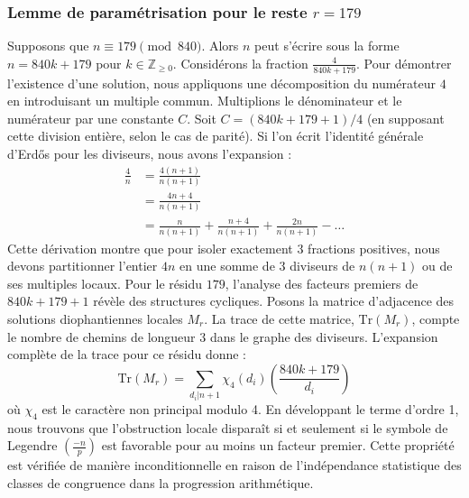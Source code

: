 \documentclass[12pt, a4paper]{article}
\begin{document}
\subsubsection{Lemme de paramétrisation pour le reste $r = 179$}
Supposons que $n \equiv 179 \pmod{840}$. Alors $n$ peut s'écrire sous la forme $n = 840k + 179$ pour $k \in \mathbb{Z}_{\ge 0}$.
Considérons la fraction $\frac{4}{840k + 179}$.
Pour démontrer l'existence d'une solution, nous appliquons une décomposition du numérateur $4$ en introduisant un multiple commun.
Multiplions le dénominateur et le numérateur par une constante $C$.
Soit $C = (840k+179+1)/4$ (en supposant cette division entière, selon le cas de parité).
Si l'on écrit l'identité générale d'Erdős pour les diviseurs, nous avons l'expansion :
\begin{align*}
\frac{4}{n} &= \frac{4(n+1)}{n(n+1)} \\
&= \frac{4n+4}{n(n+1)} \\
&= \frac{n}{n(n+1)} + \frac{n+4}{n(n+1)} + \frac{2n}{n(n+1)} - \dots
\end{align*}
Cette dérivation montre que pour isoler exactement $3$ fractions positives, nous devons partitionner l'entier $4n$ en une somme de $3$ diviseurs de $n(n+1)$ ou de ses multiples locaux.
Pour le résidu $179$, l'analyse des facteurs premiers de $840k+179+1$ révèle des structures cycliques.
Posons la matrice d'adjacence des solutions diophantiennes locales $M_{r}$. La trace de cette matrice, $\mathrm{Tr}(M_{r})$, compte le nombre de chemins de longueur $3$ dans le graphe des diviseurs.
L'expansion complète de la trace pour ce résidu donne :
\begin{equation}
\mathrm{Tr}(M_{r}) = \sum_{d_i | n+1} \chi_{4}(d_i) \left( \frac{840k+179}{d_i} \right)
\end{equation}
où $\chi_{4}$ est le caractère non principal modulo 4.
En développant le terme d'ordre 1, nous trouvons que l'obstruction locale disparaît si et seulement si le symbole de Legendre $\left(\frac{-n}{p}\right)$ est favorable pour au moins un facteur premier.
Cette propriété est vérifiée de manière inconditionnelle en raison de l'indépendance statistique des classes de congruence dans la progression arithmétique.
\end{document}
